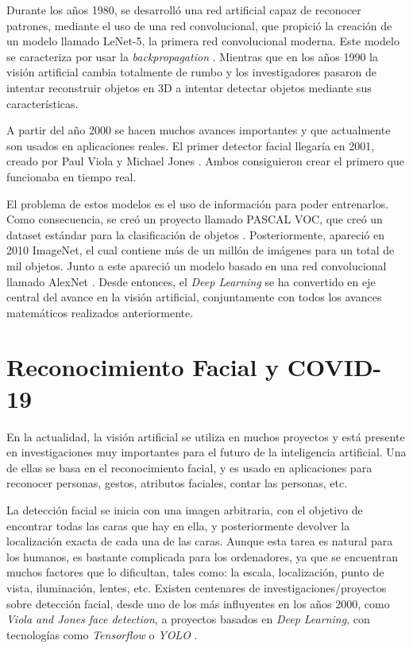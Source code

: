 Durante los años 1980, se desarrolló una red artificial capaz de reconocer patrones, mediante el uso de una red convolucional, que propició la creación de un modelo llamado LeNet-5, la primera red convolucional moderna. Este modelo se caracteriza por usar la \textit{backpropagation} \cite{histComputer}. Mientras que en los años 1990 la visión artificial cambia totalmente de rumbo y los investigadores pasaron de intentar reconstruir objetos en 3D a intentar detectar objetos mediante sus características.

A partir del año 2000 se hacen muchos avances importantes y que actualmente son usados en aplicaciones reales. El primer detector facial llegaría en 2001, creado por Paul Viola y Michael Jones \cite{paulViola}. Ambos consiguieron crear el primero que funcionaba en tiempo real.

El problema de estos modelos es el uso de información para poder entrenarlos. Como consecuencia, se creó un proyecto llamado PASCAL VOC, que creó un dataset estándar para la clasificación de objetos \cite{pascalVOC}. Posteriormente, apareció en 2010 ImageNet, el cual contiene más de un millón de imágenes para un total de mil objetos. Junto a este apareció un modelo basado en una red convolucional llamado AlexNet \cite{krizhevsky2014weird}. Desde entonces, el \textit{Deep Learning} se ha convertido en eje central del avance en la visión artificial, conjuntamente con todos los avances matemáticos realizados anteriormente.
\vspace*{-10mm}
\section{Reconocimiento Facial y COVID-19}

En la actualidad, la visión artificial se utiliza en muchos proyectos y está presente en investigaciones muy importantes para el futuro de la inteligencia artificial. Una de ellas se basa en el reconocimiento facial, y es usado en aplicaciones para reconocer personas, gestos, atributos faciales, contar las personas, etc. 

La detección facial se inicia con una imagen arbitraria, con el objetivo de encontrar todas las caras que hay en ella, y posteriormente devolver la localización exacta de cada una de las caras. Aunque esta tarea es natural para los humanos, es bastante complicada para los ordenadores, ya que se encuentran muchos factores que lo dificultan, tales como: la escala, localización, punto de vista, iluminación, lentes, etc. Existen centenares de investigaciones/proyectos sobre detección facial, desde uno de los más influyentes en los años 2000, como \textit{Viola and Jones face detection}, a proyectos basados en \textit{Deep Learning}, con tecnologías como \textit{Tensorflow} o \textit{YOLO} \cite{szeliski_2018}. 

